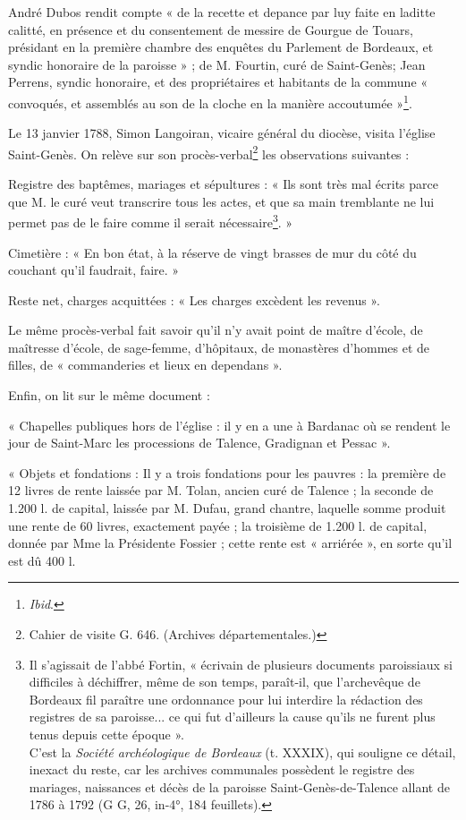 André Dubos rendit compte « de la recette et depance par luy faite en laditte calitté, en présence et du consentement de messire de Gourgue de Touars, présidant en la première chambre des enquêtes du Parlement de Bordeaux, et syndic honoraire de la paroisse » ; de M. Fourtin, curé de Saint-Genès; Jean Perrens, syndic honoraire, et des propriétaires et habitants de la commune « convoqués, et assemblés au son de la cloche en la manière accoutumée »\footnote{\textit{Ibid}.}.

Le 13 janvier 1788, Simon Langoiran, vicaire général du diocèse, visita l'église Saint-Genès. On relève sur son procès-verbal\footnote{Cahier de visite G. 646. (Archives départementales.)} les observations suivantes :

Registre des baptêmes, mariages et sépultures : « Ils sont très mal écrits parce que M. le curé veut transcrire tous les actes, et que sa main tremblante ne lui permet pas de le faire comme il serait nécessaire\footnote{Il s'agissait de l'abbé Fortin, « écrivain de plusieurs documents paroissiaux si difficiles à déchiffrer, même de son temps, paraît-il, que l'archevêque de Bordeaux fil paraître une ordonnance pour lui interdire la rédaction des registres de sa paroisse... ce qui fut d'ailleurs la cause qu'ils ne furent plus tenus depuis cette époque ».\\C'est la \textit{Société archéologique de Bordeaux} (t. XXXIX), qui souligne ce détail, inexact du reste, car les archives communales possèdent le registre des mariages, naissances et décès de la paroisse Saint-Genès-de-Talence allant de 1786 à 1792 (G G, 26, in-4°, 184 feuillets).}. »

Cimetière : « En bon état, à la réserve de vingt brasses de mur du côté du couchant qu'il faudrait, faire. »

Reste net, charges acquittées : « Les charges excèdent les revenus ».

Le même procès-verbal fait savoir qu'il n'y avait point de maître d'école, de maîtresse d'école, de sage-femme, d'hôpitaux, de monastères d'hommes et de filles, de « commanderies et lieux en dependans ».

Enfin, on lit sur le même document :

« Chapelles publiques hors de l'église : il y en a une à Bardanac où se rendent le jour de Saint-Marc les processions de Talence, Gradignan et Pessac ».

« Objets et fondations : Il y a trois fondations pour les pauvres : la première de 12 livres de rente laissée par M. Tolan, ancien curé de Talence ; la seconde de 1.200 l. de capital, laissée par M. Dufau, grand chantre, laquelle somme produit une rente de 60 livres, exactement payée ; la troisième de 1.200 l. de capital, donnée par Mme la Présidente Fossier ; cette rente est « arriérée », en sorte qu'il est dû 400 l.


